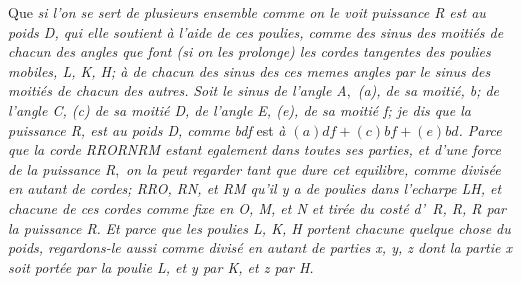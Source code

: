 \pstart
{}%
%
Que \textit{si l'on se sert de plusieurs} 
\textit{ensemble comme on le voit}
\textit{puissance \textit{R} est au poids \textit{D}, qui elle soutient à l'aide de ces poulies,
comme  des sinus des moitiés de chacun des angles que font
(si on les prolonge) les cordes tangentes des poulies mobiles, \textit{L}, \textit{K}, \textit{H}; 
à  de chacun des sinus 
des ces memes angles par le sinus des moitiés de chacun des autres.}
\textit{Soit le sinus de l'angle \textit{A}}\lbrack,\rbrack\ \textit{(\textit{a}), de sa moitié, \textit{b}; 
de l'angle \textit{C}, (\textit{c}) de sa moitié \textit{D}, de l'angle \textit{E}, (\textit{e}),
de sa moitié \textit{f}; je dis que la puissance \textit{R}, est au poids \textit{D},
comme \textit{bdf}} est \textit{à $(a)df + (c)bf + (e)bd$. Parce que la corde \textit{RRORNRM}
estant egalement}
\textit{dans toutes ses parties, et d'une force}
\textit{de la puissance \textit{R}}\lbrack,\rbrack\ \textit{on la peut regarder tant que dure cet equilibre,
comme divisée en autant de cordes; \textit{RRO}, \textit{RN}, et \textit{RM}
qu'il y a de poulies dans l'echarpe \textit{LH}, et chacune de ces cordes comme fixe
en \textit{O}, \textit{M}, et \textit{N} et tirée du costé d'~\textit{R}, \textit{R}, \textit{R} 
par la puissance \textit{R}.}
\textit{Et parce que les poulies \textit{L}, \textit{K}, \textit{H} portent
chacune quelque chose du poids, regardons-le aussi comme divisé 
en autant de parties \textit{x}, \textit{y}, \textit{z} dont la partie \textit{x} soit portée
par la poulie \textit{L}, et \textit{y} par \textit{K}, et \textit{z} par \textit{H}.}
